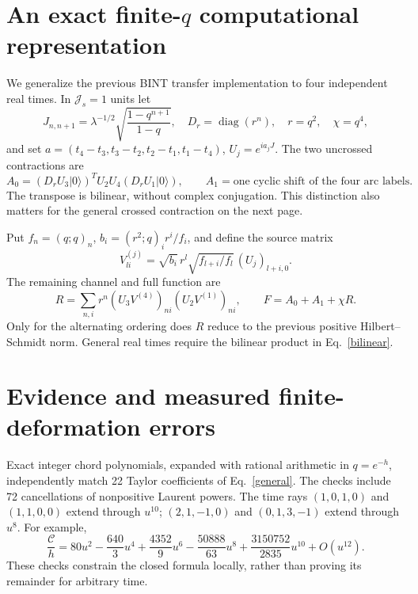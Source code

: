 \documentclass[11pt,a4paper]{article}
\newcommand{\Js}{\mathcal J_s}
\newcommand{\C}{\mathcal C}
\begin{document}
\section{An exact finite-$q$ computational representation}
We generalize the previous BINT transfer implementation \cite{bint}
to four independent real times. In $\Js=1$ units let
\begin{equation}
 J_{n,n+1}=\lambda^{-1/2}\sqrt{\frac{1-q^{n+1}}{1-q}},\quad
 D_r=\operatorname{diag}(r^n),\quad r=q^2,\quad\chi=q^4,
\end{equation}
and set $a=(t_4-t_3,t_3-t_2,t_2-t_1,t_1-t_4)$,
$U_j=e^{ia_jJ}$. The two uncrossed contractions are
\begin{equation}
 A_0=(D_rU_3|0\rangle)^T U_2U_4(D_rU_1|0\rangle),\qquad
 A_1=\text{one cyclic shift of the four arc labels}.
\end{equation}
The transpose is bilinear, without complex conjugation. This distinction
also matters for the general crossed contraction on the next page.

\newpage
Put $f_n=(q;q)_n$, $b_i=(r^2;q)_i r^i/f_i$, and define the source matrix
\begin{equation}
 V^{(j)}_{li}=\sqrt{b_i}\,r^l\sqrt{f_{l+i}/f_l}\,(U_j)_{l+i,0}.
\end{equation}
The remaining channel and full function are
\begin{equation}
 R=\sum_{n,i}r^n(U_3V^{(4)})_{ni}(U_2V^{(1)})_{ni},\qquad
 F=A_0+A_1+\chi R.\label{bilinear}
\end{equation}
Only for the alternating ordering does $R$ reduce to the previous
positive Hilbert--Schmidt norm. General real times require the bilinear
product in Eq.~\eqref{bilinear}.

\section{Evidence and measured finite-deformation errors}
Exact integer chord polynomials, expanded with rational arithmetic in
$q=e^{-h}$, independently match 22 Taylor coefficients of
Eq.~\eqref{general}. The checks include 72 cancellations of nonpositive
Laurent powers. The time rays $(1,0,1,0)$ and $(1,1,0,0)$ extend through
$u^{10}$; $(2,1,-1,0)$ and $(0,1,3,-1)$ extend through $u^8$.
For example,
\begin{equation}
 \frac{\C}{h}=80u^2-\frac{640}{3}u^4+\frac{4352}{9}u^6
 -\frac{50888}{63}u^8+\frac{3150752}{2835}u^{10}+O(u^{12}).
\end{equation}
These checks constrain the closed formula locally, rather than proving
its remainder for arbitrary time.
\end{document}
